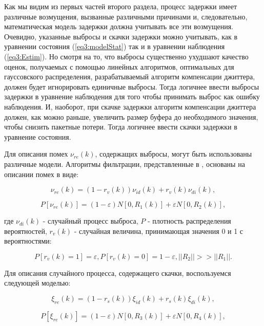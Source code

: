 Как мы видим из первых частей второго раздела, процесс задержки имеет различные возмущения, вызванные различными причинами и, следовательно, математическая модель задержки должна учитывать все эти возмущения.
Очевидно, указанные выбросы и скачки задержки можно учитывать, как в уравнении состояния (\ref{eq3:modelStat}) так и в уравнении наблюдения (\ref{eq3:Estim}). 
Но смотря на то, что выбросы существенно ухудшают качество оценок, получаемых с помощью линейных алгоритмов, оптимальных для гауссовского распределения, разрабатываемый алгоритм компенсации джиттера, должен будет игнорировать единичные выбросы. Тогда логичнее ввести выбросы задержки в уравнение наблюдения для того чтобы принимать выброс как ошибку наблюдения. 
И, наоборот, при скачке задержки алгоритм компенсации джиттера должен, как можно раньше, увеличить размер буфера до необходимого значения, чтобы снизить пакетные потери. 
Тогда логичнее ввести скачки задержки в уравнение состояния.

Для описания помех $\nu_{re}(k)$, содержащих выбросы, могут быть использованы различные модели. Алгоритмы фильтрации, представленные в \cite{masreliez_ieee, masreliez_martin, ershov_lipcer, ershov}, основаны на описании помех в виде:


\begin{equation}\label{eq3:v}
\nu_{re}(k)=(1-r_v(k))\nu_{id}(k)+r_v(k)\nu_{di}(k),
\end{equation}

\begin{equation}\label{eq3:vp}
P[\nu_{re}(k)]=(1-\varepsilon)N[0,R_1(k)]+\varepsilon N[0,R_2(k)],
\end{equation}

\noindent где $\nu_{di}(k)$ - случайный процесс выброса, $P$ - плотность распределения вероятностей, $r_v(k)$ - случайная величина, принимающая значения 0 и 1 с вероятностями:

\begin{equation}\label{eq3:vpp}
P[r_v(k)=1]=\varepsilon, P[r_v(k)=0]=1-\varepsilon, ||R_2||>>||R_1||.
\end{equation}


Для описания случайного процесса, содержащего скачки, воспользуемся следующей моделью:

\begin{equation}\label{eq3:s}
\xi_{re}(k)=(1-r_s(k))\xi_{id}(k)+r_s(k)\xi_{di}(k),
\end{equation}

\begin{equation}\label{eq3:sp}
P[\xi_{re}(k)]=(1-\varepsilon)N[0,R_3(k)]+\varepsilon N[0,R_4(k)],
\end{equation}

